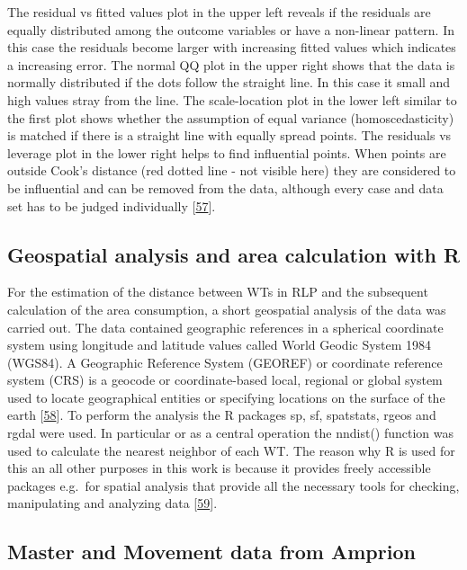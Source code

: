 \documentclass[a4paper,11pt]{article}
\begin{document}
The residual vs fitted values plot in the upper left reveals if the residuals are equally distributed among the outcome variables or have a non-linear pattern. In this case the residuals become larger with increasing fitted values which indicates a increasing error. The normal QQ plot in the upper right shows that the data is normally distributed if the dots follow the straight line. In this case it small and high values stray from the line. The scale-location plot in the lower left similar to the first plot shows whether the assumption of equal variance (homoscedasticity) is matched if there is a straight line with equally spread points. The residuals vs leverage plot in the lower right helps to find influential points. When points are outside Cook's distance (red dotted line - not visible here) they are considered to be influential and can be removed from the data, although every case and data set has to be judged individually {[}\protect\hyperlink{ref-BommaeKim.2015}{57}{]}.

\hypertarget{geospatial-analysis-and-area-calculation-with-r}{%
\subsection{Geospatial analysis and area calculation with R}\label{geospatial-analysis-and-area-calculation-with-r}}

For the estimation of the distance between WTs in RLP and the subsequent calculation of the area consumption, a short geospatial analysis of the data was carried out. The data contained geographic references in a spherical coordinate system using longitude and latitude values called World Geodic System 1984 (WGS84). A Geographic Reference System (GEOREF) or coordinate reference system (CRS) is a geocode or coordinate-based local, regional or global system used to locate geographical entities or specifying locations on the surface of the earth {[}\protect\hyperlink{ref-ISO.2007}{58}{]}. To perform the analysis the R packages sp, sf, spatstats, rgeos and rgdal were used. In particular or as a central operation the nndist() function was used to calculate the nearest neighbor of each WT. The reason why R is used for this an all other purposes in this work is because it provides freely accessible packages e.g.~for spatial analysis that provide all the necessary tools for checking, manipulating and analyzing data {[}\protect\hyperlink{ref-RogerS.Bivan.2008}{59}{]}.

\hypertarget{master-and-movement-data-from-amprion}{%
\subsection{Master and Movement data from Amprion}\label{master-and-movement-data-from-amprion}}
\end{document}
